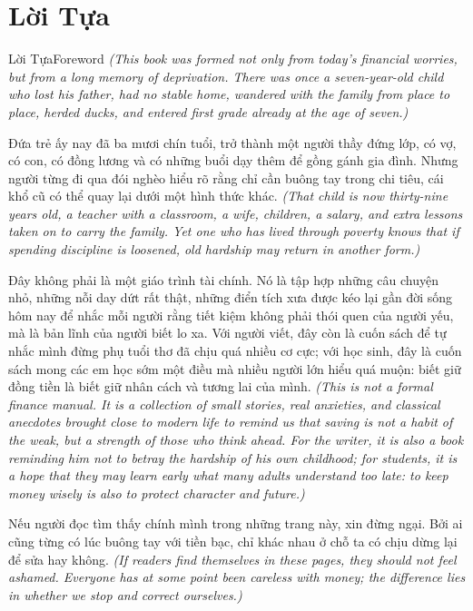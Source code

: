 \chapter*{Lời Tựa}

\begin{truyen}{Lời Tựa}{Foreword}
\textit{(This book was formed not only from today’s financial worries, but from a long memory of deprivation. There was once a seven-year-old child who lost his father, had no stable home, wandered with the family from place to place, herded ducks, and entered first grade already at the age of seven.)}

Đứa trẻ ấy nay đã ba mươi chín tuổi, trở thành một người thầy đứng lớp, có vợ, có con, có đồng lương và có những buổi dạy thêm để gồng gánh gia đình. Nhưng người từng đi qua đói nghèo hiểu rõ rằng chỉ cần buông tay trong chi tiêu, cái khổ cũ có thể quay lại dưới một hình thức khác.
\textit{(That child is now thirty-nine years old, a teacher with a classroom, a wife, children, a salary, and extra lessons taken on to carry the family. Yet one who has lived through poverty knows that if spending discipline is loosened, old hardship may return in another form.)}

Đây không phải là một giáo trình tài chính. Nó là tập hợp những câu chuyện nhỏ, những nỗi day dứt rất thật, những điển tích xưa được kéo lại gần đời sống hôm nay để nhắc mỗi người rằng tiết kiệm không phải thói quen của người yếu, mà là bản lĩnh của người biết lo xa. Với người viết, đây còn là cuốn sách để tự nhắc mình đừng phụ tuổi thơ đã chịu quá nhiều cơ cực; với học sinh, đây là cuốn sách mong các em học sớm một điều mà nhiều người lớn hiểu quá muộn: biết giữ đồng tiền là biết giữ nhân cách và tương lai của mình.
\textit{(This is not a formal finance manual. It is a collection of small stories, real anxieties, and classical anecdotes brought close to modern life to remind us that saving is not a habit of the weak, but a strength of those who think ahead. For the writer, it is also a book reminding him not to betray the hardship of his own childhood; for students, it is a hope that they may learn early what many adults understand too late: to keep money wisely is also to protect character and future.)}

Nếu người đọc tìm thấy chính mình trong những trang này, xin đừng ngại. Bởi ai cũng từng có lúc buông tay với tiền bạc, chỉ khác nhau ở chỗ ta có chịu dừng lại để sửa hay không.
\textit{(If readers find themselves in these pages, they should not feel ashamed. Everyone has at some point been careless with money; the difference lies in whether we stop and correct ourselves.)}
\end{truyen}


